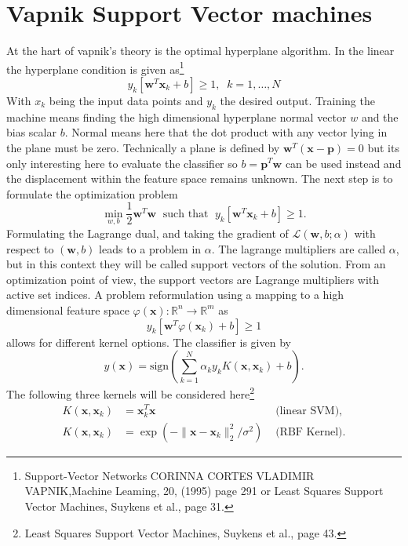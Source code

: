 \section{Vapnik Support Vector machines}
At the hart of vapnik's theory is the optimal hyperplane algorithm. In the linear the hyperplane condition is given as\footnote{Support-Vector Networks
CORINNA CORTES VLADIMIR VAPNIK,Machine Leaming, 20, (1995) page 291 or Least Squares Support Vector Machines, Suykens et al., page 31.}
\begin{equation}
y_k [\mathbf{w}^T \mathbf{x}_k + b] \geq 1, \;\; k = 1,\dots,N
\end{equation}
With $x_k$ being the input data points and $y_k$ the desired output. Training the machine means finding the high dimensional hyperplane normal vector $w$ and the bias scalar $b$. Normal means here that the dot product with any vector lying in the plane must be zero. Technically a plane is defined by $\mathbf{w}^T(\mathbf{x} - \mathbf{p}) = 0$ but its only interesting here to evaluate the classifier so $b = \mathbf{p}^T \mathbf{w}$ can be used instead and the displacement within the feature space remains unknown.
The next step is to formulate the optimization problem
\begin{equation}
\min_{w,b} \frac{1}{2} \mathbf{w}^T \mathbf{w} \;\text{ such that }\; y_k [\mathbf{w}^T \mathbf{x}_k + b] \geq 1.
\end{equation}
Formulating the Lagrange dual, and taking the gradient of $\mathcal{L}(\mathbf{w},b;\alpha)$ with respect to $(\mathbf{w},b)$ leads to a problem in $\alpha$. The lagrange multipliers are called $\alpha$, but in this context they will be called support vectors of the solution. From an optimization point of view, the support vectors are Lagrange multipliers with active set indices. A problem reformulation using a mapping to a high dimensional feature space $\varphi(\mathbf{x}): \mathbb{R}^n \rightarrow \mathbb{R}^m$ as
\begin{equation}
y_k [\mathbf{w}^T \varphi(\mathbf{x}_k) + b] \geq 1
\end{equation}
allows for different kernel options. The classifier is given by
\begin{equation}
y(\mathbf{x}) = \text{sign}(\sum^N_{k=1} \alpha_k y_k K(\mathbf{x},\mathbf{x}_k) + b).
\end{equation}
The following three kernels will be considered here\footnote{Least Squares Support Vector Machines, Suykens et al., page 43.}
\begin{align}
K(\mathbf{x},\mathbf{x}_k)  &= \mathbf{x}_k^T \mathbf{x} &\text{  (linear SVM)}, \\
K(\mathbf{x}, \mathbf{x}_k) &= \exp (-\| \mathbf{x} - \mathbf{x}_k \|^2_2 / \sigma^2) &\text{  (RBF Kernel)}.
\end{align}

